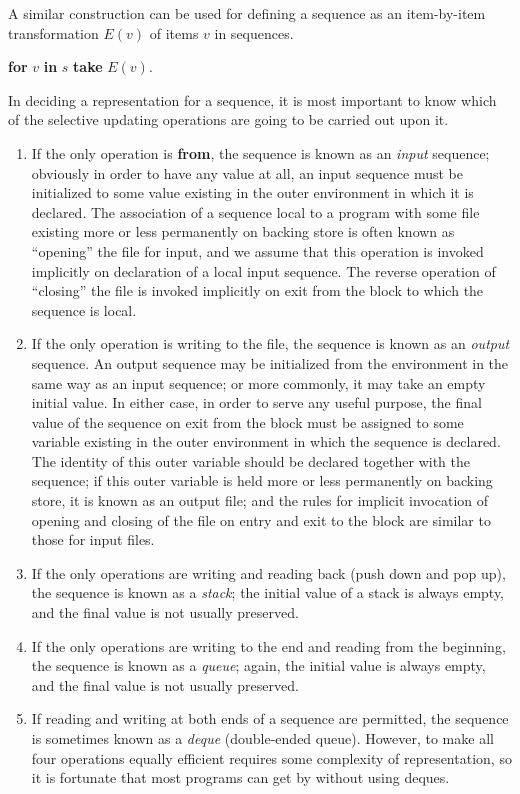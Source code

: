 \documentclass[twoside,11pt]{book}
\begin{document}
A similar construction can be used for defining a sequence as an item-by-item transformation $E(v)$ of items $v$ in sequences.

\quad \textbf{for} $v$ \textbf{in} $s$ \textbf{take} $E(v)$.

In deciding a representation for a sequence, it is most important to know which of the selective updating operations are going to be carried out upon it.

\begin{enumerate}[wide, nosep, label=(\arabic*)]
	\item If the only operation is \textbf{from}, the sequence is known as an \textit{input} sequence; obviously in order to have any value at all, an input sequence must be initialized to some value existing in the outer environment in which it is declared. The association of a sequence local to a program with some file existing more or less permanently on backing store is often known as ``opening'' the file for input, and we assume that this operation is invoked implicitly on declaration of a local input sequence. The reverse operation of ``closing'' the file is invoked implicitly on exit from the block to which the sequence is local.

	\item If the only operation is writing to the file, the sequence is known as an \textit{output} sequence. An output sequence may be initialized from the environment in the same way as an input sequence; or more commonly, it may take an empty initial value. In either case, in order to serve any useful purpose, the final value of the sequence on exit from the block must be assigned to some variable existing in the outer environment in which the sequence is declared. The identity of this outer variable should be declared together with the sequence; if this outer variable is held more or less permanently on backing store, it is known as an output file; and the rules for implicit invocation of opening and closing of the file on entry and exit to the block are similar to those for input files.

	\item If the only operations are writing and reading back (push down and 	pop up), the sequence is known as a \textit{stack}; the initial value of a stack is always empty, and the final value is not usually preserved. 

	\item If the only operations are writing to the end and reading from the beginning, the sequence is known as a \textit{queue}; again, the initial value is always empty, and the final value is not usually preserved.

	\item If reading and writing at both ends of a sequence are permitted, the sequence is sometimes known as a \textit{deque} (double-ended queue). However, to make all four operations equally efficient requires some complexity of representation, so it is fortunate that most programs can get by without using deques.
\end{enumerate}
\end{document}

